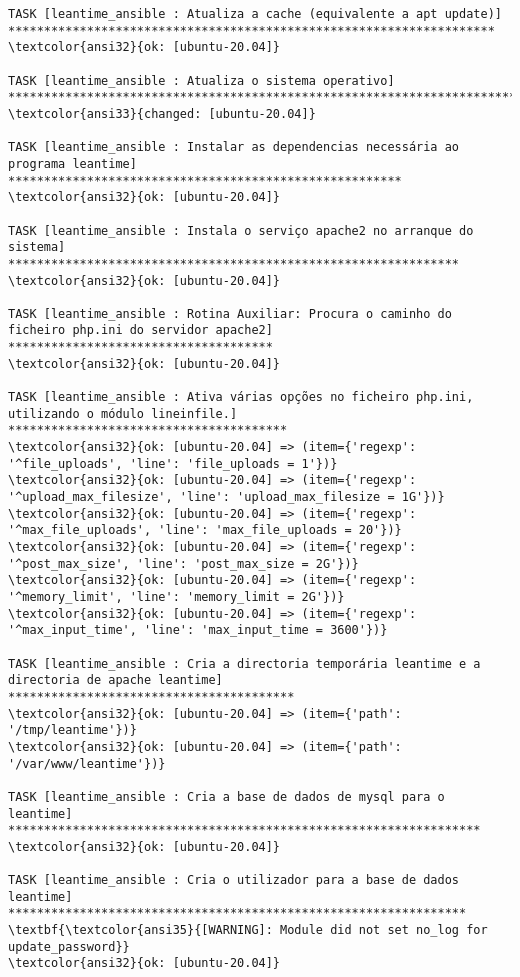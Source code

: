 \documentclass{scrartcl}
\begin{document}
\begin{Verbatim}
TASK [leantime_ansible : Atualiza a cache (equivalente a apt update)] ********************************************************************
\textcolor{ansi32}{ok: [ubuntu-20.04]}

TASK [leantime_ansible : Atualiza o sistema operativo] ***********************************************************************************
\textcolor{ansi33}{changed: [ubuntu-20.04]}

TASK [leantime_ansible : Instalar as dependencias necessária ao programa leantime] *******************************************************
\textcolor{ansi32}{ok: [ubuntu-20.04]}

TASK [leantime_ansible : Instala o serviço apache2 no arranque do sistema] ***************************************************************
\textcolor{ansi32}{ok: [ubuntu-20.04]}

TASK [leantime_ansible : Rotina Auxiliar: Procura o caminho do ficheiro php.ini do servidor apache2] *************************************
\textcolor{ansi32}{ok: [ubuntu-20.04]}

TASK [leantime_ansible : Ativa várias opções no ficheiro php.ini, utilizando o módulo lineinfile.] ***************************************
\textcolor{ansi32}{ok: [ubuntu-20.04] => (item={'regexp': '^file_uploads', 'line': 'file_uploads = 1'})}
\textcolor{ansi32}{ok: [ubuntu-20.04] => (item={'regexp': '^upload_max_filesize', 'line': 'upload_max_filesize = 1G'})}
\textcolor{ansi32}{ok: [ubuntu-20.04] => (item={'regexp': '^max_file_uploads', 'line': 'max_file_uploads = 20'})}
\textcolor{ansi32}{ok: [ubuntu-20.04] => (item={'regexp': '^post_max_size', 'line': 'post_max_size = 2G'})}
\textcolor{ansi32}{ok: [ubuntu-20.04] => (item={'regexp': '^memory_limit', 'line': 'memory_limit = 2G'})}
\textcolor{ansi32}{ok: [ubuntu-20.04] => (item={'regexp': '^max_input_time', 'line': 'max_input_time = 3600'})}

TASK [leantime_ansible : Cria a directoria temporária leantime e a directoria de apache leantime] ****************************************
\textcolor{ansi32}{ok: [ubuntu-20.04] => (item={'path': '/tmp/leantime'})}
\textcolor{ansi32}{ok: [ubuntu-20.04] => (item={'path': '/var/www/leantime'})}

TASK [leantime_ansible : Cria a base de dados de mysql para o leantime] ******************************************************************
\textcolor{ansi32}{ok: [ubuntu-20.04]}

TASK [leantime_ansible : Cria o utilizador para a base de dados leantime] ****************************************************************
\textbf{\textcolor{ansi35}{[WARNING]: Module did not set no_log for update_password}}
\textcolor{ansi32}{ok: [ubuntu-20.04]}


\end{Verbatim}
\end{document}
